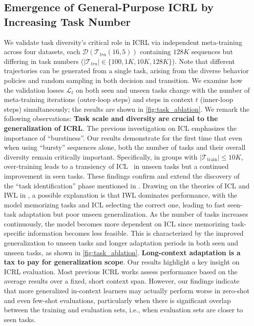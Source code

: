\documentclass{article}
\renewcommand{\cite}[1]{\citep{#1}}
\begin{document}
\subsection{Emergence of General-Purpose ICRL by Increasing Task Number}
We validate task diversity's critical role in ICRL via independent meta-training across four datasets, each $\mathcal{D}(\mathcal{T}_{tra}(16,5))$ containing $128K$ sequences but differing in task numbers ($|\mathcal{T}_{tra}| \in \{100, 1K, 10K, 128K\}$).
Note that different trajectories can be generated from a single task, arising from the diverse behavior policies and random sampling in both decision and transition.
We examine how the validation losses $\mathcal{L}_t$ on both seen and unseen tasks change with the number of meta-training iterations (outer-loop steps) and steps in context $t$ (inner-loop steps) simultaneously; the results are shown in \cref{fig:task_ablation}. We remark the following observations:
\textbf{Task scale and diversity are crucial to the generalization of ICRL}.
The previous investigation on ICL \cite{raparthy2024generalization,chan2022data} emphasizes the importance of ``burstiness''.
Our results demonstrate for the first time that even when using ``bursty'' sequences alone, both the number of tasks and their overall diversity remain critically important. Specifically, in groups with $|\mathcal{T}_{\text{train}}|\le10K$, over-training leads to a transiency of ICL~\cite{singh2024transient} in unseen tasks but a continued improvement in seen tasks. These findings confirm and extend the discovery of the ``task identification'' phase mentioned in \citet{kirsch2022general, pan2023context}.
Drawing on the theories of ICL and IWL in \citet{chantoward}, a possible explanation is that IWL dominates performance, with the model memorizing tasks and ICL selecting the correct one, leading to fast seen-task adaptation but poor unseen generalization.
As the number of tasks increases continuously, the model becomes more dependent on ICL since memorizing task-specific information becomes less feasible. This is characterized by the improved generalization to unseen tasks and longer adaptation periods in both seen and unseen tasks, as shown in \cref{fig:task_ablation}.
\textbf{Long-context adaptation is a tax to pay for generalization scope}. Our results highlight a key insight on ICRL evaluation. Most previous ICRL works assess performance based on the average results over a fixed, short context span. However, our findings indicate that more generalized in-context learners may actually perform worse in zero-shot and even few-shot evaluations, particularly when there is significant overlap between the training and evaluation sets, i.e., when evaluation sets are closer to seen tasks.
\end{document}
